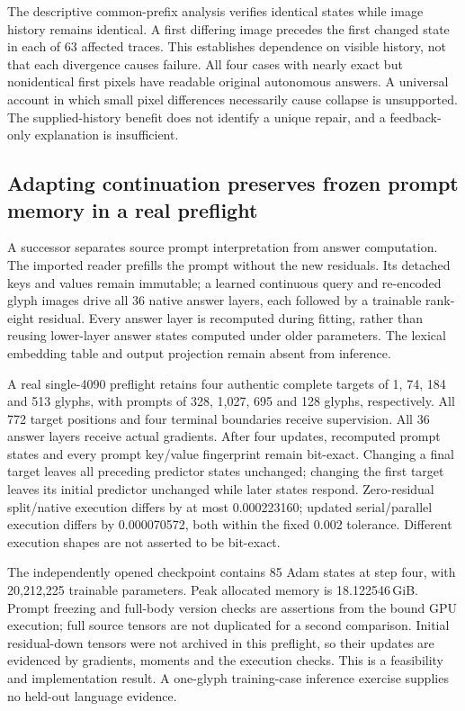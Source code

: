 \documentclass[12pt,a4paper]{article}
\providecommand{\DIFadd}[1]{{\protect\color{blue} \sf #1}} %
\begin{document}
\DIFadd{The descriptive common-prefix analysis verifies identical states while image
history remains identical. A first differing image precedes the first changed
state in each of 63 affected traces. This establishes dependence on visible
history, not that each divergence causes failure. All four cases with nearly
exact but nonidentical first pixels have readable original autonomous answers.
A universal account in which small pixel differences necessarily cause
collapse is unsupported. The supplied-history benefit does not identify a
unique repair, and a feedback-only explanation is insufficient.
}

\subsection*{\DIFadd{Adapting continuation preserves frozen prompt memory in a real preflight}}
\DIFadd{A successor separates source prompt interpretation from answer computation.
The imported reader prefills the prompt without the new residuals. Its detached
keys and values remain immutable; a learned continuous query and re-encoded
glyph images drive all 36 native answer layers, each followed by a trainable
rank-eight residual. Every answer layer is recomputed during fitting, rather
than reusing lower-layer answer states computed under older parameters.
The lexical embedding table and output projection remain absent from inference.
}

\DIFadd{A real single-4090 preflight retains four authentic complete targets of 1, 74,
184 and 513 glyphs, with prompts of 328, 1,027, 695 and 128 glyphs, respectively.
All 772 target positions and four terminal boundaries receive supervision.
All 36 answer layers receive actual gradients. After four updates, recomputed
prompt states and every prompt key/value fingerprint remain bit-exact.
Changing a final target leaves all preceding predictor states unchanged;
changing the first target leaves its initial predictor unchanged while later
states respond. Zero-residual split/native execution differs by at most
0.000223160; updated serial/parallel execution differs by 0.000070572, both
within the fixed 0.002 tolerance. Different execution shapes are not asserted
to be bit-exact.
}

\DIFadd{The independently opened checkpoint contains 85 Adam states at step four,
with 20,212,225 trainable parameters. Peak allocated memory is
18.122546\,GiB. Prompt freezing and full-body version checks are assertions
from the bound GPU execution; full source tensors are not duplicated for a
second comparison. Initial residual-down tensors were not archived in this
preflight, so their updates are evidenced by gradients, moments and the
execution checks. This is a feasibility and implementation result. A one-glyph
training-case inference exercise supplies no held-out language evidence.
}
\end{document}
